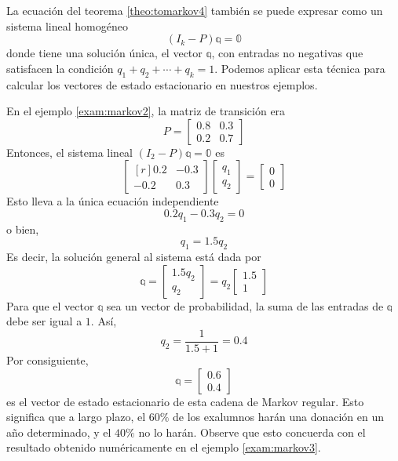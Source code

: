 La ecuación del teorema \ref{theo:tomarkov4} también se puede expresar como un sistema lineal homogéneo
$$(I_k - P)\mathbb{q} = \mathbb{0}$$
donde tiene una solución única, el vector $\mathbb{q}$, con entradas no negativas que satisfacen la condición $q_1 + q_2 + \cdots + q_k = 1$. Podemos aplicar esta técnica para calcular los vectores de estado estacionario en nuestros ejemplos.

\begin{example}
    En el ejemplo \ref{exam:markov2}, la matriz de transición era
    $$P = \begin{bmatrix} 
        0.8 & 0.3 \\ 
        0.2 & 0.7 
    \end{bmatrix}$$
    Entonces, el sistema lineal $(I_2 - P)\mathbb{q} = \mathbb{0}$ es
    $$\begin{bmatrix*}[r]
        0.2 & -0.3 \\
        -0.2 & 0.3
    \end{bmatrix*}\begin{bmatrix}
        q_1 \\
        q_2
    \end{bmatrix} = \begin{bmatrix}
        0 \\
        0
    \end{bmatrix}$$
    Esto lleva a la única ecuación independiente
    $$0.2q_1 - 0.3q_2 = 0$$
    o bien,
    $$q_1 = 1.5q_2$$
    Es decir, la solución general al sistema está dada por
    $$\mathbb{q} = \begin{bmatrix}
        1.5q_2 \\
        q_2
    \end{bmatrix} = q_2 \begin{bmatrix}
        1.5 \\
        1
    \end{bmatrix}$$
    Para que el vector $\mathbb{q}$ sea un vector de probabilidad, la suma de las entradas de $\mathbb{q}$ debe ser igual a $1$. Así,
    $$q_2 = \frac{1}{1.5 + 1} = 0.4$$
    Por consiguiente,
    $$\mathbb{q} = \begin{bmatrix}
        0.6 \\
        0.4
    \end{bmatrix}$$
    es el vector de estado estacionario de esta cadena de Markov regular. Esto significa que a largo plazo, el $60\%$ de los exalumnos harán una donación en un año determinado, y el $40\%$ no lo harán. Observe que esto concuerda con el resultado obtenido numéricamente en el ejemplo \ref{exam:markov3}.
\end{example}

